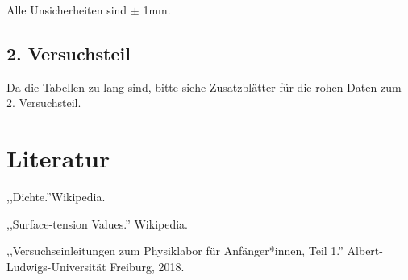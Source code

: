 \documentclass[11pt,a4paper]{article} %
\begin{document}
Alle Unsicherheiten sind $\pm$ 1mm. 

\subsection{2. Versuchsteil}
Da die Tabellen zu lang sind, bitte siehe Zusatzblätter für die rohen Daten zum 2. Versuchsteil. 




\newpage
\section{Literatur}
,,Dichte.''\space Wikipedia.

,,Surface-tension Values.'' \space Wikipedia.

,,Versuchseinleitungen zum Physiklabor für Anfänger*innen, Teil 1.'' \space  Albert-Ludwigs-Universität Freiburg, 2018. 
\end{document}
